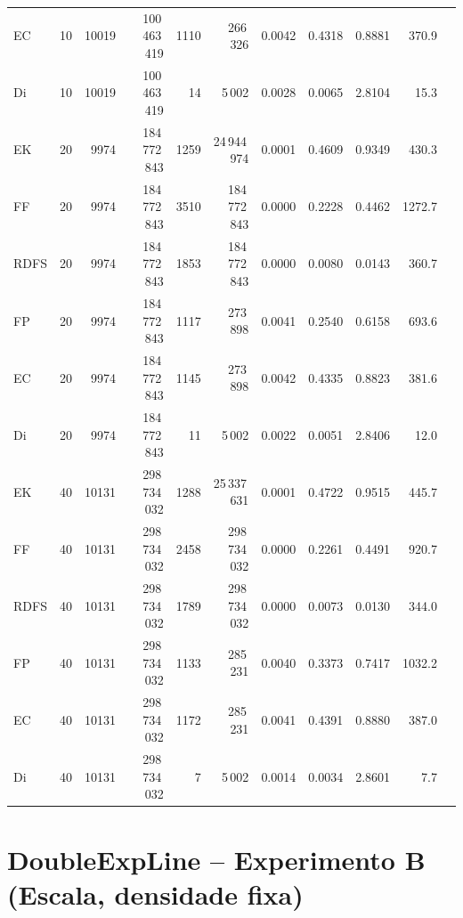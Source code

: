 \documentclass{infufrgs}
\begin{document}
\begin{table}[H]
{\begin{tabular}{llrrrrrrrrr}
EC   & 10 & 10019  & 100\,463\,419 & 1110  & 266\,326       & 0.0042 & 0.4318 & 0.8881 & 370.9  \\
Di   & 10 & 10019  & 100\,463\,419 &   14  & 5\,002         & 0.0028 & 0.0065 & 2.8104 &  15.3  \\
\midrule
EK   & 20 & 9974   & 184\,772\,843 & 1259  & 24\,944\,974  & 0.0001 & 0.4609 & 0.9349 & 430.3  \\
FF   & 20 & 9974   & 184\,772\,843 & 3510  & 184\,772\,843 & 0.0000 & 0.2228 & 0.4462 & 1272.7 \\
RDFS & 20 & 9974   & 184\,772\,843 & 1853  & 184\,772\,843 & 0.0000 & 0.0080 & 0.0143 & 360.7  \\
FP   & 20 & 9974   & 184\,772\,843 & 1117  & 273\,898       & 0.0041 & 0.2540 & 0.6158 & 693.6  \\
EC   & 20 & 9974   & 184\,772\,843 & 1145  & 273\,898       & 0.0042 & 0.4335 & 0.8823 & 381.6  \\
Di   & 20 & 9974   & 184\,772\,843 &   11  & 5\,002         & 0.0022 & 0.0051 & 2.8406 &  12.0  \\
\midrule
EK   & 40 & 10131  & 298\,734\,032 & 1288  & 25\,337\,631  & 0.0001 & 0.4722 & 0.9515 & 445.7  \\
FF   & 40 & 10131  & 298\,734\,032 & 2458  & 298\,734\,032 & 0.0000 & 0.2261 & 0.4491 & 920.7  \\
RDFS & 40 & 10131  & 298\,734\,032 & 1789  & 298\,734\,032 & 0.0000 & 0.0073 & 0.0130 & 344.0  \\
FP   & 40 & 10131  & 298\,734\,032 & 1133  & 285\,231       & 0.0040 & 0.3373 & 0.7417 & 1032.2 \\
EC   & 40 & 10131  & 298\,734\,032 & 1172  & 285\,231       & 0.0041 & 0.4391 & 0.8880 & 387.0  \\
Di   & 40 & 10131  & 298\,734\,032 &    7  & 5\,002         & 0.0014 & 0.0034 & 2.8601 &   7.7  \\
\bottomrule
\end{tabular}}
\end{table}

\section{DoubleExpLine -- Experimento B (Escala, densidade fixa)}
\end{document}

